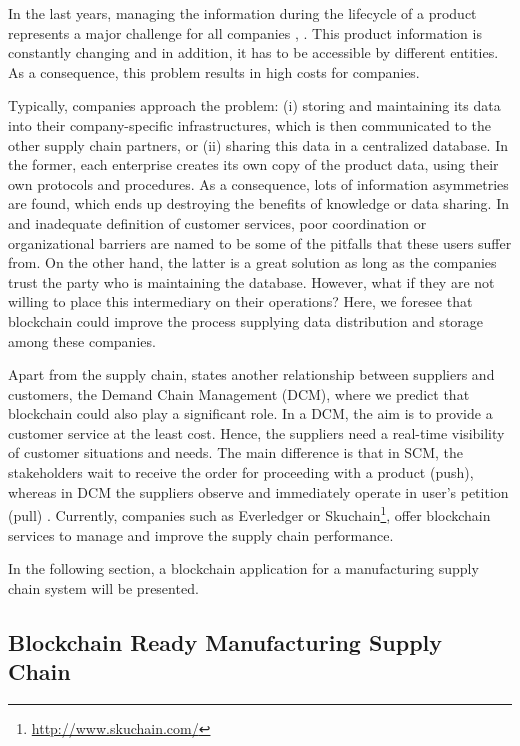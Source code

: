 In the last years, managing the information during the lifecycle of a product represents a major challenge for all companies \citep{karkkainen2003product}, \citep{tuttle2002you}. This product information is constantly changing and in addition, it has to be accessible by different entities. As a consequence, this problem results in high costs for companies. 

Typically, companies approach the problem: (i) storing and maintaining its data into their company-specific infrastructures, which is then communicated to the other supply chain partners, or (ii) sharing this data in a centralized database. In the former, each enterprise creates its own copy of the product data, using their own protocols and procedures.  As a consequence, lots of information asymmetries are found, which ends up destroying the benefits of knowledge or data sharing. In \citep{lee1992managing} and \citep{fiala2005information} inadequate definition of customer services, poor coordination or organizational barriers are named to be some of the pitfalls that these users suffer from. On the other hand, the latter is a great solution as long as the companies trust the party who is maintaining the database. However, what if they are not willing to place this intermediary on their operations? Here, we foresee that blockchain could improve the process supplying data distribution and storage among these companies.

Apart from the supply chain, \citep{heikkila2002supply} states another relationship between suppliers and customers, the Demand Chain Management (DCM), where we predict that blockchain could also play a significant role. In a DCM, the aim is to provide a customer service at the least cost. Hence, the suppliers need a real-time visibility of customer situations and needs. The main difference is that in SCM, the stakeholders wait to receive the order for proceeding with a product (push), whereas in DCM the suppliers observe and immediately operate in user's petition (pull) \citep{wust2017you}. Currently, companies such as Everledger or Skuchain\footnote{\url{http://www.skuchain.com/}}, offer blockchain services to manage and improve the supply chain performance.
 
In the following section, a blockchain application for a manufacturing supply chain system will be presented.

\subsection{Blockchain Ready Manufacturing Supply Chain} \label{manufacturing}

